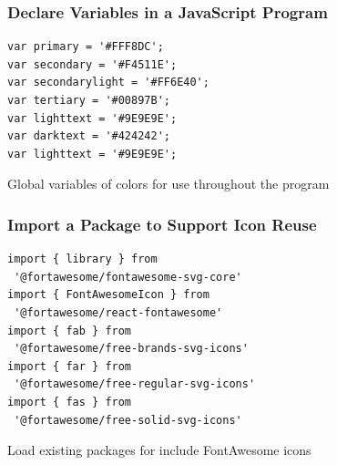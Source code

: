 \documentclass[14pt,aspectratio=169]{beamer}
\begin{document}
%
\begin{frame}[fragile]
  \frametitle{Declare Variables in a JavaScript Program}
  \normalsize
  \hspace*{.2in}
  \begin{minipage}{6in}
    \vspace*{.2in}
    \begin{verbatim}
var primary = '#FFF8DC';
var secondary = '#F4511E';
var secondarylight = '#FF6E40';
var tertiary = '#00897B';
var lighttext = '#9E9E9E';
var darktext = '#424242';
var lighttext = '#9E9E9E';
    \end{verbatim}
  \end{minipage}
  \vspace*{.1in}
  \begin{center}
    Global variables of colors for use throughout the program \\
  \end{center}
\end{frame}

%
\begin{frame}[fragile]
  \frametitle{Import a Package to Support Icon Reuse}
  \normalsize
  \hspace*{-.05in}
  \begin{minipage}{6in}
    \vspace*{.1in}
    \begin{verbatim}
import { library } from
 '@fortawesome/fontawesome-svg-core'
import { FontAwesomeIcon } from
 '@fortawesome/react-fontawesome'
import { fab } from
 '@fortawesome/free-brands-svg-icons'
import { far } from
 '@fortawesome/free-regular-svg-icons'
import { fas } from
 '@fortawesome/free-solid-svg-icons'
    \end{verbatim}
  \end{minipage}
  \vspace*{.05in}
  \begin{center}
     Load existing packages for include FontAwesome icons
  \end{center}
\end{frame}
\end{document}
